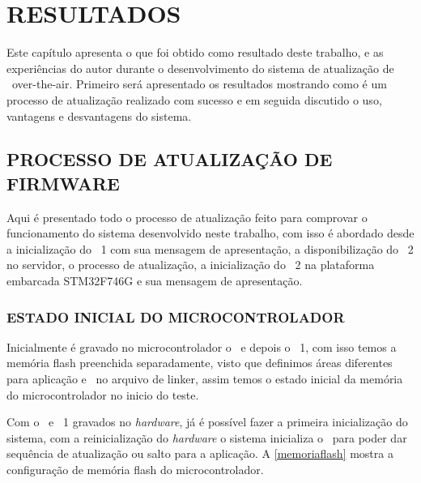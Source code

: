 \chapter{RESULTADOS}
\label{Chap:Resultados}

Este capítulo apresenta o que foi obtido como resultado deste trabalho, e as experiências do autor durante o desenvolvimento do sistema de atualização de \firmware\ over-the-air. Primeiro será apresentado os resultados mostrando como é um processo de atualização realizado com sucesso e em seguida discutido o uso, vantagens e desvantagens do sistema. 

\section{PROCESSO DE ATUALIZAÇÃO DE FIRMWARE}
Aqui é presentado todo o processo de atualização feito para comprovar o funcionamento do sistema desenvolvido neste trabalho, com isso é abordado desde a inicialização do \firmware\ 1 com sua mensagem de apresentação, a disponibilização do \firmware\ 2 no servidor, o processo de atualização, a inicialização do \firmware\ 2 na plataforma embarcada STM32F746G e sua mensagem de apresentação.

\subsection{ESTADO INICIAL DO MICROCONTROLADOR}
Inicialmente é gravado no microcontrolador o \bootloader\ e depois o \firmware\ 1, com isso temos a memória flash preenchida separadamente, visto que definimos áreas diferentes para aplicação e \bootloader\ no arquivo de linker, assim temos o estado inicial da memória do microcontrolador no inicio do teste.

Com o \bootloader\ e \firmware\ 1 gravados no \textit{hardware}, já é possível fazer a primeira inicialização do sistema, com a reinicialização do \textit{hardware} o sistema inicializa o \bootloader\ para poder dar sequência de atualização ou salto para a aplicação. A \autoref{memoriaflash} mostra a configuração de memória flash do microcontrolador.

